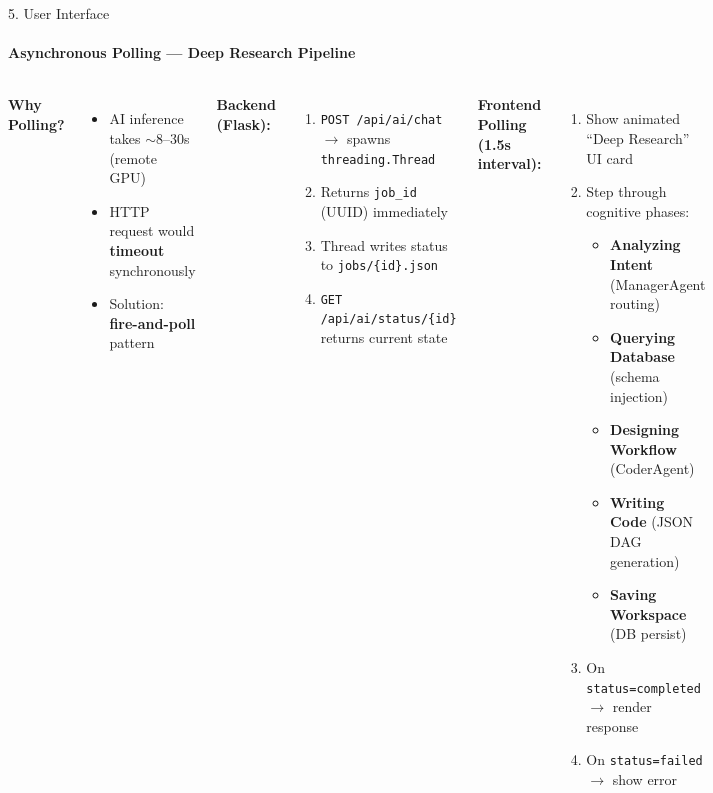 \documentclass[10pt]{beamer}
\begin{document}
\begin{frame}{5. User Interface}
    \framesubtitle{Asynchronous Polling --- Deep Research Pipeline}
    \begin{columns}
        \textbf{Why Polling?}
        \begin{itemize}
            \item AI inference takes $\sim$8--30s (remote GPU)
            \item HTTP request would \textbf{timeout} synchronously
            \item Solution: \textbf{fire-and-poll} pattern
        \end{itemize}
        \vspace{0.3cm}
        \textbf{Backend (Flask):}
        \begin{enumerate}
            \item \texttt{POST /api/ai/chat} $\rightarrow$ spawns \texttt{threading.Thread}
            \item Returns \texttt{job\_id} (UUID) immediately
            \item Thread writes status to \texttt{jobs/\{id\}.json}
            \item \texttt{GET /api/ai/status/\{id\}} returns current state
        \end{enumerate}

        \textbf{Frontend Polling (1.5s interval):}
        \begin{enumerate}
            \item Show animated ``Deep Research'' UI card
            \item Step through cognitive phases:
            \begin{itemize}
                \item[\ding{182}] \textbf{Analyzing Intent} (ManagerAgent routing)
                \item[\ding{183}] \textbf{Querying Database} (schema injection)
                \item[\ding{184}] \textbf{Designing Workflow} (CoderAgent)
                \item[\ding{185}] \textbf{Writing Code} (JSON DAG generation)
                \item[\ding{186}] \textbf{Saving Workspace} (DB persist)
            \end{itemize}
            \item On \texttt{status=completed} $\rightarrow$ render response
            \item On \texttt{status=failed} $\rightarrow$ show error
        \end{enumerate}
    \end{columns}
    \vfill
    \centering
    
\end{frame}
\end{document}
